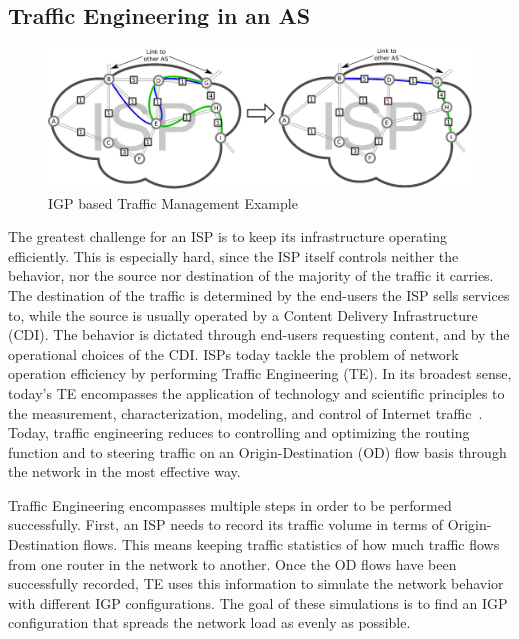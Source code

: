 \subsection{Traffic Engineering in an AS}

\begin{figure} \begin{center}
\includegraphics[width=1\linewidth]{figures/Classic-TE.eps} 
\end{center} 
\caption{IGP based Traffic Management Example} 
\label{fig:SimplifiedTE} 
\end{figure}

The greatest challenge for an ISP is to keep its infrastructure operating
efficiently. This is especially hard, since the ISP itself controls neither the
behavior, nor the source nor destination of the majority of the traffic it
carries. The destination of the traffic is determined by the end-users the ISP
sells services to, while the source is usually operated by a Content Delivery
Infrastructure (CDI). The behavior is dictated through end-users requesting
content, and by the operational choices of the CDI. ISPs today tackle the
problem of network operation efficiency by performing Traffic Engineering (TE).
In its broadest sense, today's TE encompasses the application of technology and
scientific principles to the measurement, characterization, modeling, and
control of Internet traffic~\cite{Awduche_OverviewTE:2002}. Today, traffic
engineering reduces to controlling and optimizing the routing function and to
steering traffic on an Origin-Destination (OD) flow basis through the network
in the most effective way.

Traffic Engineering encompasses multiple steps in order to be performed
successfully. First, an ISP needs to record its traffic volume in terms of
Origin-Destination flows. This means keeping traffic statistics of how much
traffic flows from one router in the network to another. Once the OD flows have
been successfully recorded, TE uses this information to simulate the network
behavior with different IGP configurations. The goal of these simulations is to
find an IGP configuration that spreads the network load as evenly as possible.

